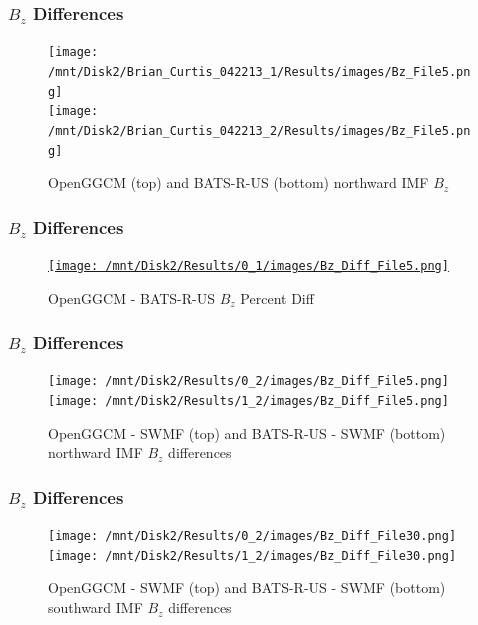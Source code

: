 \begin{frame}
\frametitle{$B_z$ Differences}
\begin{center}
\begin{figure}
\texttt{[image: /mnt/Disk2/Brian\_Curtis\_042213\_1/Results/images/Bz\_File5.png]}\\
\texttt{[image: /mnt/Disk2/Brian\_Curtis\_042213\_2/Results/images/Bz\_File5.png]}\\
\caption{OpenGGCM (top) and BATS-R-US (bottom) northward IMF $B_z$}
\end{figure}
\end{center}
\end{frame}


\begin{frame}
\frametitle{$B_z$ Differences}
\begin{center}
\begin{figure}
\href{images/1_ReversalB.pdf}{\texttt{[image: /mnt/Disk2/Results/0\_1/images/Bz\_Diff\_File5.png]}}\\
\caption{OpenGGCM - BATS-R-US $B_z$ Percent Diff }
\end{figure}
\end{center}
\end{frame}

\begin{frame}
\frametitle{$B_z$ Differences}
\begin{center}
\begin{figure}
\texttt{[image: /mnt/Disk2/Results/0\_2/images/Bz\_Diff\_File5.png]}\\
\texttt{[image: /mnt/Disk2/Results/1\_2/images/Bz\_Diff\_File5.png]}\\
\caption{OpenGGCM - SWMF (top) and BATS-R-US - SWMF (bottom) northward IMF
$B_z$ differences}
\end{figure}
\end{center}
\end{frame}

\begin{frame}
\frametitle{$B_z$ Differences}
\begin{center}
\begin{figure}
\texttt{[image: /mnt/Disk2/Results/0\_2/images/Bz\_Diff\_File30.png]}\\
\texttt{[image: /mnt/Disk2/Results/1\_2/images/Bz\_Diff\_File30.png]}\\
\caption{OpenGGCM - SWMF (top) and BATS-R-US - SWMF (bottom) southward IMF
$B_z$ differences}
\end{figure}
\end{center}
\end{frame}

